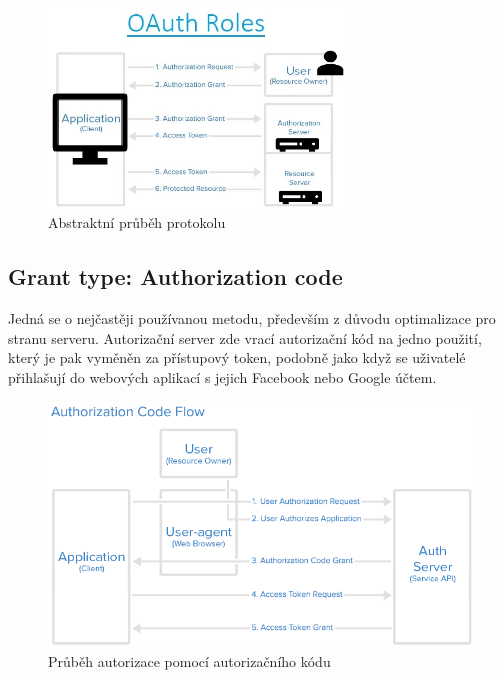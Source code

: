 \begin{figure}[H]
    \centering
    \includegraphics[width=0.7\textwidth]{figures/OAuth_abstract_flow.png}
    \caption{Abstraktní průběh protokolu}%
    \label{fig:Oauth_roles_diagram}
\end{figure}


\subsection{Grant type: Authorization code}
Jedná se o nejčastěji používanou metodu, především z důvodu optimalizace pro stranu serveru. Autorizační server zde vrací autorizační kód na jedno použití, který je pak vyměněn za přístupový token, podobně jako když se uživatelé přihlašují do webových aplikací s jejich Facebook nebo Google účtem.

\begin{figure}[ht]
    \centering
    \includegraphics[width=\textwidth]{figures/OAuth_code_flow.png}
    \caption[short]{Průběh autorizace pomocí autorizačního kódu}%
    \label{fig:Oauth_auth_flow}
\end{figure}


